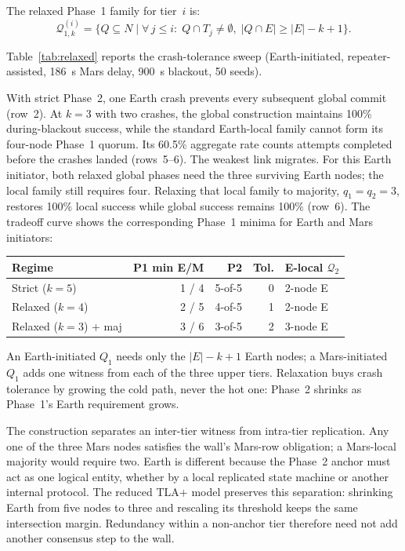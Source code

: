 \documentclass[letterpaper,twocolumn,10pt]{article}
\newcounter{cor}
\begin{document}
The relaxed Phase~1 family for tier~$i$ is:
\[
\mathcal{Q}_{1,k}^{(i)} = \bigl\{Q \subseteq N \;\big|\; \forall\, j \le i:\; Q \cap T_j \neq \emptyset,\; |Q \cap E| \ge |E| - k + 1\bigr\}.
\]

Table~\ref{tab:relaxed} reports the crash-tolerance sweep (Earth-initiated, repeater-assisted, 186~s Mars delay, 900~s blackout, 50 seeds).

With strict Phase~2, one Earth crash prevents every subsequent global commit (row~2). At $k=3$ with two crashes, the global construction maintains 100\% during-blackout success, while the standard Earth-local family cannot form its four-node Phase~1 quorum. Its 60.5\% aggregate rate counts attempts completed before the crashes landed (rows~5--6). The weakest link migrates. For this Earth initiator, both relaxed global phases need the three surviving Earth nodes; the local family still requires four. Relaxing that local family to majority, $q_1=q_2=3$, restores 100\% local success while global success remains 100\% (row~6). The tradeoff curve shows the corresponding Phase~1 minima for Earth and Mars initiators:

\begin{center}
\small
\setlength{\tabcolsep}{3.5pt}
\begin{tabular}{lrrrl}
\toprule
Regime & P1 min E/M & P2 & Tol. & E-local $\mathcal{Q}_2$ \\
\midrule
Strict ($k = 5$) & 1 / 4 & 5-of-5 & 0 & 2-node E \\
Relaxed ($k = 4$) & 2 / 5 & 4-of-5 & 1 & 2-node E \\
Relaxed ($k = 3$) + maj & 3 / 6 & 3-of-5 & 2 & 3-node E \\
\bottomrule
\end{tabular}
\end{center}
An Earth-initiated $Q_1$ needs only the $|E|-k+1$ Earth nodes; a Mars-initiated $Q_1$ adds one witness from each of the three upper tiers. Relaxation buys crash tolerance by growing the cold path, never the hot one: Phase~2 shrinks as Phase~1's Earth requirement grows.

The construction separates an inter-tier witness from intra-tier replication. Any one of the three Mars nodes satisfies the wall's Mars-row obligation; a Mars-local majority would require two. Earth is different because the Phase~2 anchor must act as one logical entity, whether by a local replicated state machine or another internal protocol. The reduced TLA+ model preserves this separation: shrinking Earth from five nodes to three and rescaling its threshold keeps the same intersection margin. Redundancy within a non-anchor tier therefore need not add another consensus step to the wall.
\end{document}
